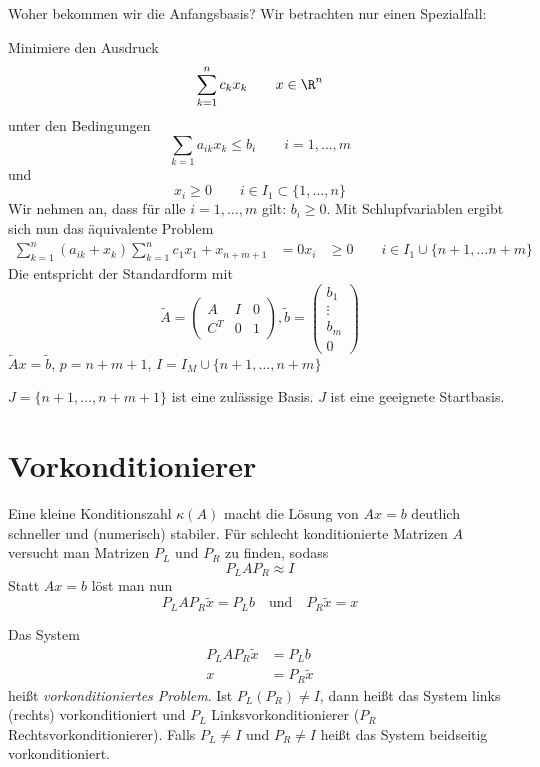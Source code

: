 \documentclass{mycourse}
\begin{document}
\begin{seg}{Woher bekommen wir die Anfangsbasis?}
	Wir betrachten nur einen Spezialfall:

	Minimiere den Ausdruck 
	\[
		\sum_{k=1}^nc_kx_k \qquad x\in \R^n
	\]
	unter den Bedingungen
	\[
		\sum_{k=1}a_{ik}x_k \le b_i \qquad i=1,\dotsc,m
	\]
	und
	\[
		x_i \ge 0 \qquad i\in I_1\subset \{1,\dotsc,n\}
	\]
	Wir nehmen an, dass für alle $i=1,\dotsc,m$ gilt: $b_i\ge 0$.
	Mit Schlupfvariablen ergibt sich nun das äquivalente Problem
	\begin{align*}
		\sum_{k=1}^n(a_{ik}+x_k)
		\sum_{k=1}^n c_1x_1 + x_{n+m+1}&=0
		x_i &\ge 0 \qquad i\in I_1 \cup\{n+1,\dotsc n+m\}
	\end{align*}
	Die entspricht der Standardform mit
	\[
		\tilde A = \begin{pmatrix} A & I & 0 \\ C^T & 0 & 1\end{pmatrix}, \tilde b = \begin{pmatrix}b_1\\\vdots \\ b_m \\0\end{pmatrix}
	\]
	$\tilde A x = \tilde b$, $p=n+m+1$, $I=I_M\cup\{n+1,\dotsc,n+m\}$
	
	$J=\{n+1,\dotsc,n+m+1\}$ ist eine zulässige Basis.
	$J$ ist eine geeignete Startbasis.
\end{seg}


\chapter{Vorkonditionierer}

Eine kleine Konditionszahl $\kappa(A)$ macht die Lösung von $Ax=b$ deutlich schneller und (numerisch) stabiler.
Für schlecht konditionierte Matrizen $A$ versucht man Matrizen $P_L$ und $P_R$ zu finden, sodass
\[
	P_LAP_R \approx I
\]
Statt $Ax=b$ löst man nun
\[
	P_LAP_R\tilde x = P_Lb \quad \text{und} \quad P_R\tilde x = x
\]
\begin{df}
	\label{df:6.1}
	Das System
	\begin{align*}
		P_L A P_R\tilde x &= P_L b\\
		x&=P_R\tilde x
	\end{align*}
	heißt \emph{vorkonditioniertes Problem}.
	Ist $P_L(P_R)\neq I$, dann heißt das System links (rechts) vorkonditioniert und $P_L$ Linksvorkonditionierer ($P_R$ Rechtsvorkonditionierer).
	Falls $P_L\neq I$ und $P_R\neq I$ heißt das System beidseitig vorkonditioniert.
\end{df}
\end{document}
